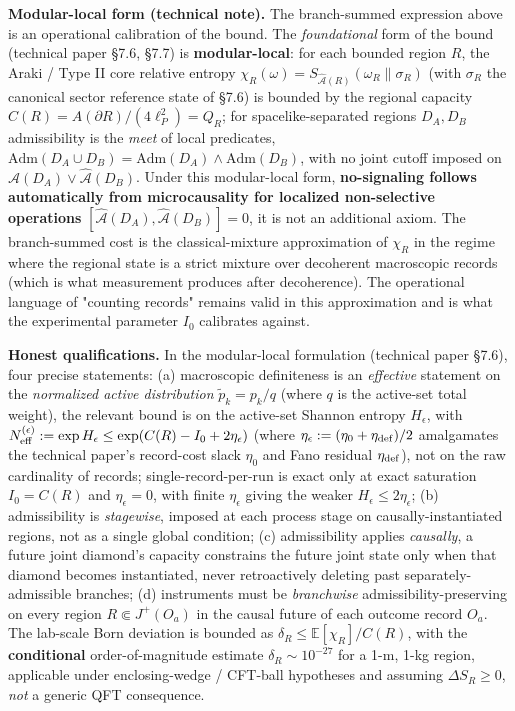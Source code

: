 \documentclass[11pt,a4paper]{article}
\begin{document}
\textbf{Modular-local form (technical note).} The branch-summed expression above is an operational calibration of the bound. The \emph{foundational} form of the bound (technical paper §7.6, §7.7) is \textbf{modular-local}: for each bounded region $R$, the Araki / Type II core relative entropy $\chi_R(\omega) = S_{\hat{\mathcal{A}}(R)}(\omega_R \| \sigma_R)$ (with $\sigma_R$ the canonical sector reference state of §7.6) is bounded by the regional capacity $C(R) = A(\partial R)/(4\ell_P^2) = Q_R$; for spacelike-separated regions $D_A, D_B$ admissibility is the \emph{meet} of local predicates, $\mathrm{Adm}(D_A \cup D_B) = \mathrm{Adm}(D_A) \wedge \mathrm{Adm}(D_B)$, with no joint cutoff imposed on $\hat{\mathcal{A}}(D_A) \vee \hat{\mathcal{A}}(D_B)$. Under this modular-local form, \textbf{no-signaling follows automatically from microcausality for localized non-selective operations} $[\hat{\mathcal{A}}(D_A), \hat{\mathcal{A}}(D_B)] = 0$, it is not an additional axiom. The branch-summed cost is the classical-mixture approximation of $\chi_R$ in the regime where the regional state is a strict mixture over decoherent macroscopic records (which is what measurement produces after decoherence). The operational language of "counting records" remains valid in this approximation and is what the experimental parameter $I_0$ calibrates against.

\textbf{Honest qualifications.} In the modular-local formulation (technical paper §7.6), four precise statements: (a) macroscopic definiteness is an \emph{effective} statement on the \emph{normalized active distribution} $\tilde p_k = p_k/q$ (where $q$ is the active-set total weight), the relevant bound is on the active-set Shannon entropy $H_\epsilon$, with $N^{(\epsilon)}_{\rm eff} := \exp H_\epsilon \le \exp(C(R) - I_0 + 2\eta_\epsilon)$ (where $\eta_\epsilon := (\eta_0 + \eta_{\rm def})/2$ amalgamates the technical paper's record-cost slack $\eta_0$ and Fano residual $\eta_{\rm def}$), not on the raw cardinality of records; single-record-per-run is exact only at exact saturation $I_0 = C(R)$ and $\eta_\epsilon = 0$, with finite $\eta_\epsilon$ giving the weaker $H_\epsilon \le 2\eta_\epsilon$; (b) admissibility is \emph{stagewise}, imposed at each process stage on causally-instantiated regions, not as a single global condition; (c) admissibility applies \emph{causally}, a future joint diamond's capacity constrains the future joint state only when that diamond becomes instantiated, never retroactively deleting past separately-admissible branches; (d) instruments must be \emph{branchwise} admissibility-preserving on every region $R \Subset J^+(O_a)$ in the causal future of each outcome record $O_a$. The lab-scale Born deviation is bounded as $\delta_R \le \mathbb{E}[\chi_R]/C(R)$, with the \textbf{conditional} order-of-magnitude estimate $\delta_R \sim 10^{-27}$ for a 1-m, 1-kg region, applicable under enclosing-wedge / CFT-ball hypotheses and assuming $\Delta S_R \ge 0$, \emph{not} a generic QFT consequence.
\end{document}
